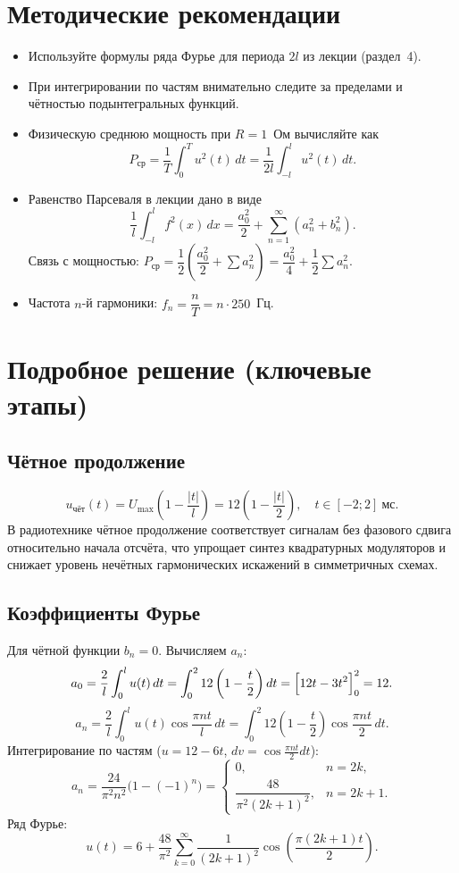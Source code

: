 \documentclass[a4paper,12pt]{article}
\begin{document}
\section{Методические рекомендации}
\begin{itemize}[label=$\triangleright$]
    \item Используйте формулы ряда Фурье для периода $2l$ из лекции (раздел~4).
    \item При интегрировании по частям внимательно следите за пределами и чётностью подынтегральных функций.
    \item Физическую среднюю мощность при $R=1$~Ом вычисляйте как 
    \[
    P_{\text{ср}} = \frac{1}{T} \int_0^T u^2(t) \, dt = \frac{1}{2l} \int_{-l}^l u^2(t) \, dt.
    \]
    \item Равенство Парсеваля в лекции дано в виде 
    \[
    \frac{1}{l} \int_{-l}^l f^2(x) \, dx = \frac{a_0^2}{2} + \sum_{n=1}^\infty (a_n^2 + b_n^2).
    \]
    Связь с мощностью: $P_{\text{ср}} = \dfrac{1}{2}\left(\dfrac{a_0^2}{2} + \sum a_n^2\right) = \dfrac{a_0^2}{4} + \dfrac{1}{2}\sum a_n^2$.
    \item Частота $n$-й гармоники: $f_n = \dfrac{n}{T} = n \cdot 250$~Гц.
\end{itemize}

\section{Подробное решение (ключевые этапы)}

\subsection{Чётное продолжение}
\[
u_{\text{чёт}}(t) = U_{\max}\left(1 - \frac{|t|}{l}\right) = 12\left(1 - \frac{|t|}{2}\right), \quad t \in [-2; 2]~\text{мс}.
\]
В радиотехнике чётное продолжение соответствует сигналам без фазового сдвига относительно начала отсчёта, что упрощает синтез квадратурных модуляторов и снижает уровень нечётных гармонических искажений в симметричных схемах.

\subsection{Коэффициенты Фурье}
Для чётной функции $b_n = 0$. Вычисляем $a_n$:
\[
a_0 = \frac{2}{l} \int_0^l u(t) \, dt = \int_0^2 12\left(1 - \frac{t}{2}\right) dt = \Bigl[12t - 3t^2\Bigr]_0^2 = 12.
\]
\[
a_n = \frac{2}{l} \int_0^l u(t) \cos\frac{\pi n t}{l} \, dt = \int_0^2 12\left(1 - \frac{t}{2}\right) \cos\frac{\pi n t}{2} \, dt.
\]
Интегрирование по частям ($u=12-6t$, $dv=\cos\frac{\pi n t}{2}dt$):
\[
a_n = \frac{24}{\pi^2 n^2}\bigl(1 - (-1)^n\bigr) = 
\begin{cases}
0, & n = 2k, \\[4pt]
\dfrac{48}{\pi^2 (2k+1)^2}, & n = 2k+1.
\end{cases}
\]
Ряд Фурье:
\[
u(t) = 6 + \frac{48}{\pi^2} \sum_{k=0}^{\infty} \frac{1}{(2k+1)^2} \cos\left(\frac{\pi (2k+1) t}{2}\right).
\]
\end{document}
